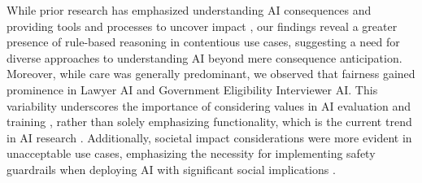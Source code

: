 While prior research has emphasized understanding AI consequences \citep{kieslich2024myfuture} and providing tools and processes to uncover impact \citep{wang2024farsight,buccinca2023aha, deng2024supporting}, our findings reveal a greater presence of rule-based reasoning in contentious use cases, suggesting a need for diverse approaches to understanding AI beyond mere consequence anticipation. Moreover, while care was generally predominant, we observed that fairness gained prominence in Lawyer AI and Government Eligibility Interviewer AI. This variability underscores the importance of considering values in AI evaluation and training \citep{barocas2021evaluation,bhardwaj2024machine}, rather than solely emphasizing functionality, which is the current trend in AI research \citep{birhane2022values}. Additionally, societal impact considerations were more evident in unacceptable use cases, emphasizing the necessity for implementing safety guardrails when deploying AI with significant social implications \citep{solaiman2023genairelease}.



